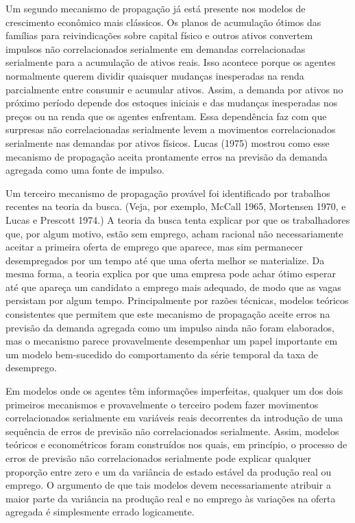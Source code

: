\documentclass[a4paper,12pt]{article}[abntex2]
\begin{document}
Um segundo mecanismo de propagação já está presente nos modelos de crescimento econômico mais clássicos. Os planos de acumulação ótimos das famílias para reivindicações sobre capital físico e outros ativos convertem impulsos não correlacionados serialmente em demandas correlacionadas serialmente para a acumulação de ativos reais. Isso acontece porque os agentes normalmente querem dividir quaisquer mudanças inesperadas na renda parcialmente entre consumir e acumular ativos. Assim, a demanda por ativos no próximo período depende dos estoques iniciais e das mudanças inesperadas nos preços ou na renda que os agentes enfrentam. Essa dependência faz com que surpresas não correlacionadas serialmente levem a movimentos correlacionados serialmente nas demandas por ativos físicos. Lucas (1975) mostrou como esse mecanismo de propagação aceita prontamente erros na previsão da demanda agregada como uma fonte de impulso.

Um terceiro mecanismo de propagação provável foi identificado por trabalhos recentes na teoria da busca. (Veja, por exemplo, McCall 1965, Mortensen 1970, e Lucas e Prescott 1974.) A teoria da busca tenta explicar por que os trabalhadores que, por algum motivo, estão sem emprego, acham racional não necessariamente aceitar a primeira oferta de emprego que aparece, mas sim permanecer desempregados por um tempo até que uma oferta melhor se materialize. Da mesma forma, a teoria explica por que uma empresa pode achar ótimo esperar até que apareça um candidato a emprego mais adequado, de modo que as vagas persistam por algum tempo. Principalmente por razões técnicas, modelos teóricos consistentes que permitem que este mecanismo de propagação aceite erros na previsão da demanda agregada como um impulso ainda não foram elaborados, mas o mecanismo parece provavelmente desempenhar um papel importante em um modelo bem-sucedido do comportamento da série temporal da taxa de desemprego.

Em modelos onde os agentes têm informações imperfeitas, qualquer um dos dois primeiros mecanismos e provavelmente o terceiro podem fazer movimentos correlacionados serialmente em variáveis reais decorrentes da introdução de uma sequência de erros de previsão não correlacionados serialmente. Assim, modelos teóricos e econométricos foram construídos nos quais, em princípio, o processo de erros de previsão não correlacionados serialmente pode explicar qualquer proporção entre zero e um da variância de estado estável da produção real ou emprego. O argumento de que tais modelos devem necessariamente atribuir a maior parte da variância na produção real e no emprego às variações na oferta agregada é simplesmente errado logicamente.
\end{document}
